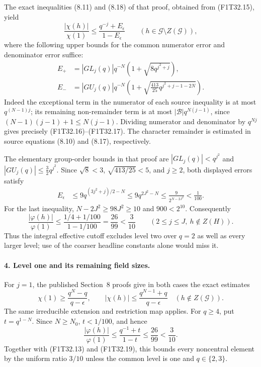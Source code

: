The exact inequalities (8.11) and (8.18) of that proof,
obtained from (F1T32.15), yield
\[
 \frac{|\chi(h)|}{\chi(1)}
 \le\frac{q^{-j}+E_\epsilon}{1-E_\epsilon}
       \qquad(h\in\mathcal G\setminus Z(\mathcal G)),
 \tag{F1T32.16}
\]
where the following upper bounds for the common
numerator error and denominator error suffice:
\[
 \begin{aligned}
 E_+&=|GL_j(q)|q^{-N}
        \left(1+\sqrt{8q^{j^2+j}}\right),\\
 E_-&=|GU_j(q)|q^{-N}
        \left(1+\sqrt{\tfrac{413}{25}q^{j^2+j-1-2N}}\right).
 \end{aligned}
 \tag{F1T32.17}
\]
Indeed the exceptional term in the numerator of each
source inequality is at most \(q^{(N-1)j}\); its
remaining non-remainder term is at most
\(|\mathcal B|q^{N(j-1)}\), since
\((N-1)(j-1)+1\le N(j-1)\).
Dividing numerator and denominator by \(q^{Nj}\)
gives precisely (F1T32.16)--(F1T32.17).
The character remainder is estimated in source
equations (8.10) and (8.17), respectively.

The elementary group-order bounds in that proof are
\(|GL_j(q)|<q^{j^2}\) and
\(|GU_j(q)|\le\tfrac32q^{j^2}\).
Since \(\sqrt8<3\), \(\sqrt{413/25}<5\), and
\(j\ge2\), both displayed errors satisfy
\[
 \begin{aligned}
 E_\epsilon
 &\le9q^{(3j^2+j)/2-N}
 \le9q^{2J^2-N}
 \le\frac9{2^{N-2J^2}}
 <\frac1{100}.
 \end{aligned}
 \tag{F1T32.18}
\]
For the last inequality, \(N-2J^2\ge98J^2\ge10\)
and \(900<2^{10}\). Consequently
\[
 \frac{|\varphi(h)|}{\varphi(1)}
 \le\frac{1/4+1/100}{1-1/100}
 =\frac{26}{99}<\frac3{10}
 \qquad(2\le j\le J,\ h\notin Z(H)).
 \tag{F1T32.19}
\]
Thus the integral effective cutoff excludes level two
over \(q=2\) as well as every larger level; use of
the coarser headline constants alone would miss it.

\paragraph{4. Level one and its remaining field sizes.}
For \(j=1\), the published Section~8 proofs give in
both cases the exact estimates
\[
 \chi(1)\ge\frac{q^N-q}{q-\epsilon},\qquad
 |\chi(h)|\le\frac{q^{N-1}+q}{q-\epsilon}
       \quad(h\notin Z(\mathcal G)).
 \tag{F1T32.20}
\]
The same irreducible extension and restriction map
applies. For \(q\ge4\), put \(t=q^{1-N}\).
Since \(N\ge N_0\), \(t<1/100\), and hence
\[
 \frac{|\varphi(h)|}{\varphi(1)}
 \le\frac{q^{-1}+t}{1-t}
 \le\frac{26}{99}<\frac3{10}.
 \tag{F1T32.21}
\]
Together with (F1T32.13) and (F1T32.19), this bounds
every noncentral element by the uniform ratio \(3/10\)
unless the common level is one and \(q\in\{2,3\}\).

